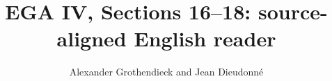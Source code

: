 
\setlength{\emergencystretch}{3em}



\title{EGA IV, Sections 16--18: source-aligned English reader}
\author{Alexander Grothendieck and Jean Dieudonn\'e}
\date{}
\maketitle
\tableofcontents







